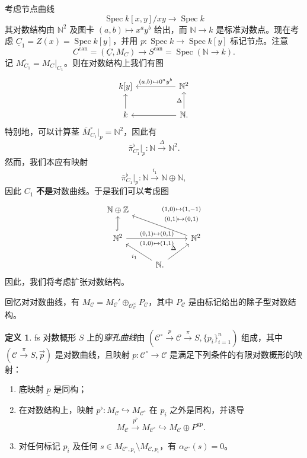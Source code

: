 \documentclass{amsart}
\theoremstyle{definition}
\newtheorem{defn}[thm]{定义}
\theoremstyle{remark}
\theoremstyle{plain}
\theoremstyle{definition}
\theoremstyle{remark}
\newcommand{\N}{\mathbb{N}}
\newcommand{\Z}{\mathbb{Z}}
\newcommand{\mc}[1]{\mathcal{#1}}
\newcommand{\mr}[1]{\mathrm{#1}}
\newcommand{\on}[1]{\operatorname{#1}}
\newcommand{\ul}[1]{\underline{#1}}
\newcommand{\1}{\mathbf{1}}
\newcommand{\2}{\mathbf{2}}
\newcommand{\3}{\mathbf{3}}
\DeclareMathOperator{\Spec}{Spec}
\begin{document}
考虑节点曲线
\[ \Spec k[x,y]/xy \to \Spec k \]
其对数结构由 \(\N^2\) 及图卡 \((a,b) \mapsto x^a y^b\) 给出，而 \(\N \to k\) 是标准对数点。现在考虑 \(\ul{C}_1 = Z(x) = \Spec k[y]\)，并用 \(p \colon \Spec k \to \Spec k[y]\) 标记节点。注意
\[ C^{\on{can}} = (\ul{C}, M_C) \to S^{\on{can}} = \Spec(\N \to k). \]
记 \(M_{C_1}^{\circ} = M_C|_{C_1}\)。则在对数结构上我们有图
\begin{equation*}
\begin{tikzcd}
    k[y] & & \N^2 \ar{ll}[swap]{(a,b) \mapsto 0^a y^b} \\
    k \ar{u} & & \N \ar{ll} \ar{u}{\Delta}.
\end{tikzcd}
\end{equation*}
特别地，可以计算茎 \(\bar{M}_{C_1}^{\circ}|_p = \N^2\)，因此有
\[ \bar{\pi}_{C_1^{\circ}}^{\flat} |_p \colon \N \xrightarrow{\Delta} \N^2. \]
然而，我们本应有映射
\[ \bar{\pi}^{\flat}_{C_1}|_p \colon \N \xrightarrow{i_1} \N \oplus \N, \]
因此 \(C_1\) \textbf{不是}对数曲线。于是我们可以考虑图
\begin{equation*}
\begin{tikzcd}
    \N \oplus \Z \\
    \N^2 \ar[hookrightarrow]{u} \ar{rr}{(0,1)\mapsto (0,1)}[swap]{(1,0)\mapsto (1,1)} & & \N^2 \ar{ull}[swap]{\Vectorstack{{(1,0)\mapsto(1,-1)} {(0,1)\mapsto(0,1)}}} \\
    & \N \ar{ul}{i_1} \ar{ur}{\Delta}.
\end{tikzcd}
\end{equation*}
因此，我们将考虑扩张对数结构。

回忆对对数曲线，有 \(M_{\mc{C}} = M_{\mc{C}}' \oplus_{\mc{O}_{\mc{C}}^{\times}} P_{\mc{C}}\)，其中 \(P_{\mc{C}}\) 是由标记给出的除子型对数结构。

\begin{defn}
    fs 对数概形 \(S\) 上的\textit{穿孔曲线}由 \((\mc{C}^{\circ} \xrightarrow{p} \mc{C} \xrightarrow{\pi} S, \{p_i\}_{i=1}^n)\) 组成，其中 \((\mc{C} \xrightarrow{\pi} S, \vec{p})\) 是对数曲线，且映射 \(p \colon \mc{C}^{\circ} \to \mc{C}\) 是满足下列条件的有限对数概形的映射：
    \begin{enumerate}
        \item 底映射 \(\ul{p}\) 是同构；
        \item 在对数结构上，映射 \(p^{\flat} \colon M_{\mc{C}} \hookrightarrow M_{\mc{C}^{\circ}}\) 在 \(p_i\) 之外是同构，并诱导
            \[ M_{\mc{C}} \xrightarrow{p^{\flat}} M_{\mc{C}^{\circ}} \hookrightarrow M_{\mc{C}} \oplus P^{\mr{gp}}. \]
        \item 对任何标记 \(p_i\) 及任何 \(s \in M_{\mc{C}^{\circ}, p_i} \setminus M_{\mc{C}, p_i}\)，有 \(\alpha_{\mc{C}^{\circ}}(s) = 0\)。
    \end{enumerate}
\end{defn}
\end{document}
